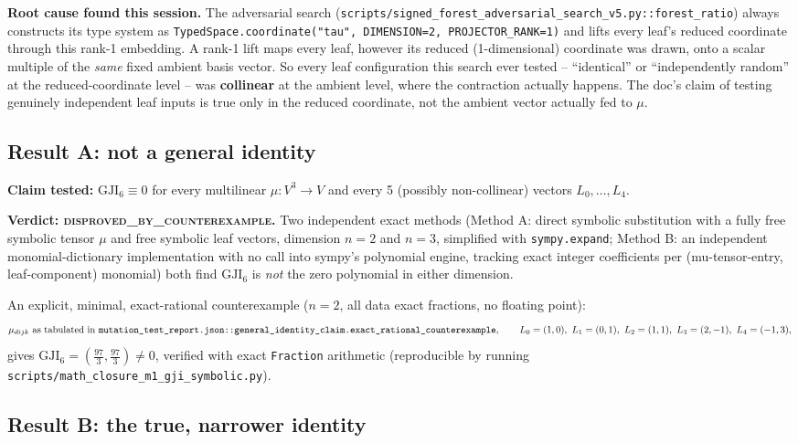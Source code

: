 \textbf{Root cause found this session.} The adversarial search
(\texttt{scripts/signed\_forest\_adversarial\_search\_v5.py::forest\_ratio})
always constructs its type system as
\texttt{TypedSpace.coordinate("tau", DIMENSION=2, PROJECTOR\_RANK=1)} and
lifts every leaf's reduced coordinate through this rank-1 embedding. A
rank-1 lift maps every leaf, however its reduced (1-dimensional)
coordinate was drawn, onto a scalar multiple of the \emph{same} fixed
ambient basis vector. So every leaf configuration this search ever tested
-- ``identical'' or ``independently random'' at the reduced-coordinate
level -- was \textbf{collinear} at the ambient level, where the
contraction actually happens. The doc's claim of testing genuinely
independent leaf inputs is true only in the reduced coordinate, not the
ambient vector actually fed to $\mu$.

\subsection*{Result A: not a general identity}

\textbf{Claim tested:} $\mathrm{GJI}_6 \equiv 0$ for every multilinear
$\mu:V^3\to V$ and every 5 (possibly non-collinear) vectors
$L_0,\dots,L_4$.

\textbf{Verdict: \textsc{disproved\_by\_counterexample}.} Two independent
exact methods (Method A: direct symbolic substitution with a fully free
symbolic tensor $\mu$ and free symbolic leaf vectors, dimension $n=2$ and
$n=3$, simplified with \texttt{sympy.expand}; Method B: an independent
monomial-dictionary implementation with no call into sympy's polynomial
engine, tracking exact integer coefficients per
(mu-tensor-entry, leaf-component) monomial) both find $\mathrm{GJI}_6$ is
\emph{not} the zero polynomial in either dimension.

An explicit, minimal, exact-rational counterexample ($n=2$, all data
exact fractions, no floating point):
\[
  \mu_{dijk} \text{ as tabulated in
  \texttt{mutation\_test\_report.json::general\_identity\_claim.exact\_rational\_counterexample}},
  \qquad
  L_0=(1,0),\ L_1=(0,1),\ L_2=(1,1),\ L_3=(2,-1),\ L_4=(-1,3),
\]
gives $\mathrm{GJI}_6 = \left(\tfrac{97}{3}, \tfrac{97}{3}\right) \neq 0$,
verified with exact \texttt{Fraction} arithmetic (reproducible by running
\texttt{scripts/math\_closure\_m1\_gji\_symbolic.py}).

\subsection*{Result B: the true, narrower identity}

